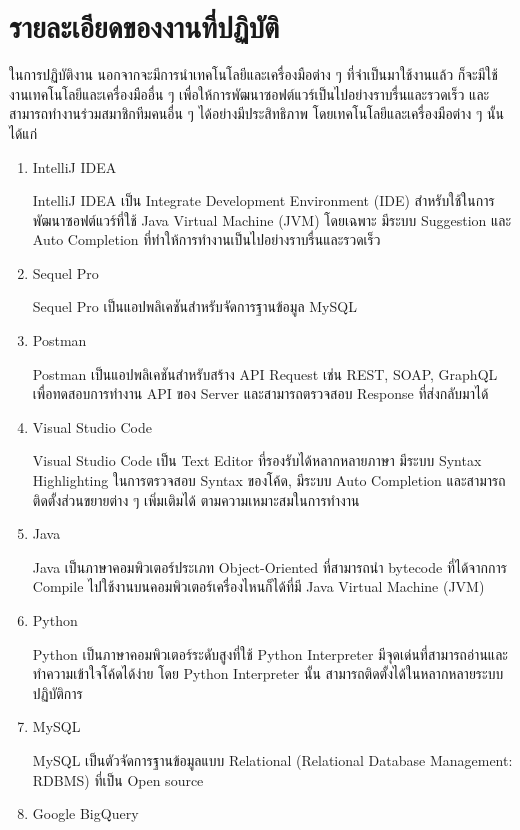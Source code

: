 \section{รายละเอียดของงานที่ปฏิบัติ}
ในการปฏิบัติงาน นอกจากจะมีการนำเทคโนโลยีและเครื่องมือต่าง ๆ ที่จำเป็นมาใช้งานแล้ว ก็จะมีใช้งานเทคโนโลยีและเครื่องมืออื่น ๆ เพื่อให้การพัฒนาซอฟต์แวร์เป็นไปอย่างราบรื่นและรวดเร็ว และสามารถทำงานร่วมสมาชิกทีมคนอื่น ๆ ได้อย่างมีประสิทธิภาพ  โดยเทคโนโลยีและเครื่องมือต่าง ๆ นั้น ได้แก่
\begin{enumerate}
	\item IntelliJ IDEA
	
	IntelliJ IDEA เป็น Integrate Development Environment (IDE) สำหรับใช้ในการพัฒนาซอฟต์แวร์ที่ใช้ Java Virtual Machine (JVM) โดยเฉพาะ มีระบบ Suggestion และ Auto Completion ที่ทำให้การทำงานเป็นไปอย่างราบรื่นและรวดเร็ว
	
	\item Sequel Pro
	
	Sequel Pro เป็นแอปพลิเคชันสำหรับจัดการฐานข้อมูล MySQL
	
	\item Postman
	
	Postman เป็นแอปพลิเคชันสำหรับสร้าง API Request เช่น REST, SOAP, GraphQL เพื่อทดสอบการทำงาน API ของ Server และสามารถตรวจสอบ Response ที่ส่งกลับมาได้
	
	\item Visual Studio Code
	
	Visual Studio Code เป็น Text Editor ที่รองรับได้หลากหลายภาษา มีระบบ Syntax Highlighting ในการตรวจสอบ Syntax ของโค้ด, มีระบบ Auto Completion และสามารถติดตั้งส่วนขยายต่าง ๆ เพิ่มเติมได้ ตามความเหมาะสมในการทำงาน
	
	\item Java
	
	Java เป็นภาษาคอมพิวเตอร์ประเภท Object-Oriented ที่สามารถนำ bytecode ที่ได้จากการ Compile ไปใช้งานบนคอมพิวเตอร์เครื่องไหนก็ได้ที่มี Java Virtual Machine (JVM)
	
	\item Python
	
	Python เป็นภาษาคอมพิวเตอร์ระดับสูงที่ใช้ Python Interpreter มีจุดเด่นที่สามารถอ่านและทำความเข้าใจโค้ดได้ง่าย โดย Python Interpreter นั้น สามารถติดตั้งได้ในหลากหลายระบบปฏิบัติการ 
	
	\item MySQL
	
	MySQL เป็นตัวจัดการฐานข้อมูลแบบ Relational (Relational Database Management: RDBMS) ที่เป็น Open source
	
	\item Google BigQuery
	

\end{enumerate}
